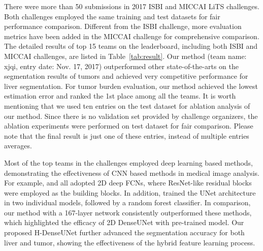 \documentclass[journal]{IEEEtran}
\begin{document}
There were more than 50 submissions in 2017 ISBI and MICCAI LiTS
challenges.
Both challenges employed the same training and test datasets for fair performance comparison.
Different from the ISBI challenge, more evaluation metrics have been added in the MICCAI challenge for comprehensive comparison.
The detailed results of top 15 teams on the leaderboard, including both ISBI and MICCAI challenges, are listed in Table~\ref{tab:result}. Our method (team name: xjqi, entry date: Nov. 17, 2017) outperformed other state-of-the-arts on the segmentation results of tumors and achieved very competitive performance for liver segmentation. 
For tumor burden evaluation, our method achieved the lowest estimation error and ranked the 1st place among all the teams. 
It is worth mentioning that we used ten entries on the test dataset for ablation analysis of our method. Since there is no validation set provided by challenge organizers,  the ablation experiments were performed on test dataset for fair comparison. Please note that the final result is just one of these entries, instead of multiple entries averages. 


Most of the top teams in the challenges employed deep learning based methods, demonstrating the effectiveness of CNN based methods in medical image analysis.
For example, \citet{han2017automatic,vorontsov2017liver} and \citet{bi2017automatic} all adopted 2D deep FCNs, where ResNet-like residual blocks were employed as the building blocks.
In addition, \citet{chlebus2017neural} trained the UNet architecture in two individual models, followed by a random forest classifier.
In comparison, our method with a 167-layer network consistently outperformed these methods, which highlighted the efficacy of 2D DenseUNet with pre-trained model.
Our proposed H-DenseUNet further advanced the segmentation accuracy for both liver and tumor, showing the effectiveness of the hybrid feature learning process.
\end{document}
